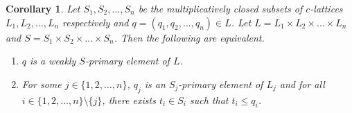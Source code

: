 \documentclass[10pt,twoside,a4paper]{amsart}
\numberwithin{equation}{section}
\theoremstyle{plain}
\newtheorem{cor}[lem]{Corollary}
\theoremstyle{definition}
\begin{document}
\begin{cor}%
	Let $S_1, S_2, \dots , S_n$ be the multiplicatively closed subsets of $c$-lattices $L_1, L_2, \dots , L_n$ respectively and $q=(q_1,q_2,\dots,q_n)\in L$. Let $L=L_1\times L_2\times \dots \times L_n$ and $S=S_1\times S_2\times \dots \times S_n$. Then the following are equivalent.
	\begin{enumerate}
		\item%
		$q$ is a weakly $S$-primary element of $L$.
		\item%
		For some $j\in \{1,2,\dots,n\}$, $q_j$ is an $S_j$-primary element of $L_j$ and for all $i\in \{1,2,\dots,n\}\setminus \{j\}$, there exists $t_i\in S_i$ such that $t_i\leq q_i$.
	\end{enumerate}
\end{cor}
\end{document}
